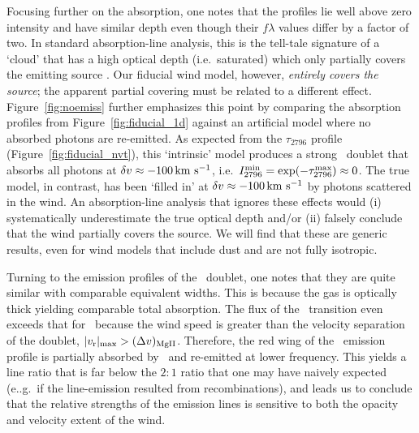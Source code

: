 \documentclass[12pt,preprint]{aastex}
\begin{document}
Focusing further on the  absorption, one notes that the profiles lie
well above zero intensity and have similar depth even though their $f\lambda$
values differ by a factor of two.  In standard absorption-line
analysis, this is 
the tell-tale signature of a `cloud' that has a high optical depth (i.e.\
saturated) which only partially covers the emitting source
\citep[e.g.][]{rvs05a,hkp+10}.  Our fiducial wind model, however, 
{\it entirely covers the source}; the apparent partial covering must
be related to a different effect.
Figure~\ref{fig:noemiss} further emphasizes this point by comparing the 
absorption profiles from Figure~\ref{fig:fiducial_1d} against an
artificial model where no absorbed photons are 
re-emitted.   As expected from the
$\tau_{2796}$ profile (Figure~\ref{fig:fiducial_nvt}), this
`intrinsic' model
produces a strong \mgiid\ doublet that absorbs all photons at
$\delta v \approx -100 \, {\rm km~s^{-1}}$, i.e.\ $I_{2796}^{\rm min} = \exp(-\tau^{\rm
  max}_{2796}) \approx 0$.
The true model, in contrast, has been `filled in' at $\delta v \approx -100
\, {\rm km~s^{-1}}$ by photons scattered in the wind.  An
absorption-line analysis that ignores these effects
would (i) systematically underestimate the true optical
depth and/or (ii) falsely conclude that the wind partially covers the
source.  We will find that these are
generic results, even for wind models that include
dust and are not fully isotropic.

Turning to the emission profiles of the \mgiid\ doublet, one notes
that they are quite similar with comparable equivalent widths.
This is because the gas is optically
thick yielding comparable total absorption. The
flux of the \mgiib\ transition even exceeds that for \mgiia\ 
because the wind speed is greater than the velocity separation
of the doublet, $|v_{\rm r}|_{\rm max} > (\Delta v)_{\rm MgII}$.
Therefore, the red wing of the
\mgiia\ emission profile is partially absorbed by \mgiib\ and
re-emitted at lower frequency.
This yields a
line ratio that is far below the $2:1$ ratio that one may have naively
expected (e..g.\ if the line-emission resulted from recombinations),
and leads us to conclude that the relative 
strengths of the emission lines is sensitive to both the opacity and
velocity extent of the wind. 
\end{document}
